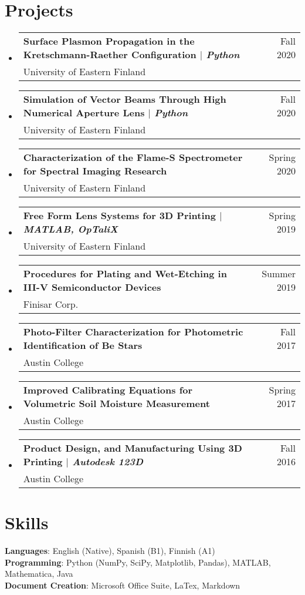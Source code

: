 \documentclass[letterpaper,11pt]{article} %
\makeatletter
\newcommand{\CVSubheading}[4]{
  \vspace{-2pt}\item
    \begin{tabular*}{0.97\textwidth}[t]{l@{\extracolsep{\fill}}r}
      \textbf{#1} & #2 \\
      \small#3 & \small #4 \\
    \end{tabular*}\vspace{-7pt}
}
\newcommand{\CVSubHeadingListStart}{\begin{itemize}[leftmargin=0.15in, label={}]} %
\newcommand{\CVSubHeadingListEnd}{\end{itemize}}
\makeatother
\begin{document}
\section{Projects}
\CVSubHeadingListStart
\CVSubheading
{{Surface Plasmon Propagation in the Kretschmann-Raether Configuration} $|$ \emph{\small{Python}}}{Fall 2020}
{University of Eastern Finland}{}
\CVSubheading
{{Simulation of Vector Beams Through High Numerical Aperture Lens} $|$ \emph{\small{Python}}}{Fall 2020}
{University of Eastern Finland}{}
\CVSubheading
{Characterization of the Flame-S Spectrometer for Spectral Imaging Research}{Spring 2020}
{University of Eastern Finland}{}
\CVSubheading
{{Free Form Lens Systems for 3D Printing} $|$ \emph{\small{MATLAB, OpTaliX}}}{Spring 2019}
{University of Eastern Finland}{}
\CVSubheading
{Procedures for Plating and Wet-Etching in III-V Semiconductor Devices}{Summer 2019}
{Finisar Corp.}{}
\CVSubheading
{Photo-Filter Characterization for Photometric Identification of Be Stars}{Fall 2017}
{Austin College}{}
\CVSubheading
{Improved Calibrating Equations for Volumetric Soil Moisture Measurement}{Spring 2017}
{Austin College}{}
\CVSubheading
{{Product Design, and Manufacturing Using 3D Printing} $|$ \emph{\small{Autodesk 123D}}}{Fall 2016}
{Austin College}{}
\CVSubHeadingListEnd

\section{Skills}
\begin{itemize}[leftmargin=0.5cm, label={}]
  \small{\item{
        \textbf{Languages}{: English (Native), Spanish (B1), Finnish (A1)} \\
        \textbf{Programming}{: Python (NumPy, SciPy, Matplotlib, Pandas), MATLAB, Mathematica, Java} \\
        \textbf{Document Creation}{: Microsoft Office Suite, LaTex, Markdown} \\
        }}
\end{itemize}

\end{document}
